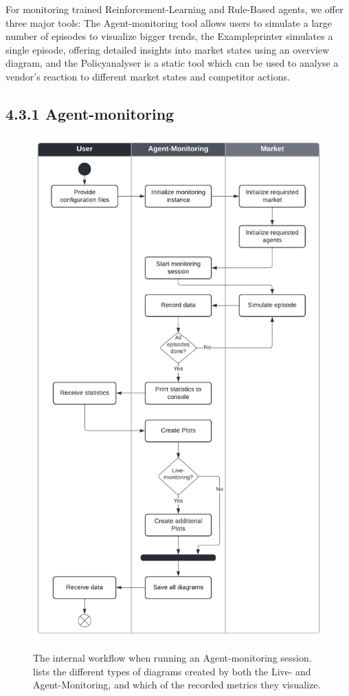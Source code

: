 For monitoring trained Reinforcement-Learning and Rule-Based agents, we offer three major tools: The Agent-monitoring tool allows users to simulate a large number of episodes to visualize bigger trends, the Exampleprinter simulates a single episode, offering detailed insights into market states using an overview diagram, and the Policyanalyser is a static tool which can be used to analyse a vendor's reaction to different market states and competitor actions.

\subsection*{4.3.1 Agent-monitoring}\label{subsec:AgentMonitoring}

\begin{figure}
	\centering
	\includegraphics[height = 0.9\textheight]{images/swimlane_monitoring.pdf}\\
	\caption{The internal workflow when running an Agent-monitoring session.  lists the different types of diagrams created by both the Live- and Agent-Monitoring, and which of the recorded metrics they visualize.}\label{fig:SwimlaneMonitoring}
\end{figure}

